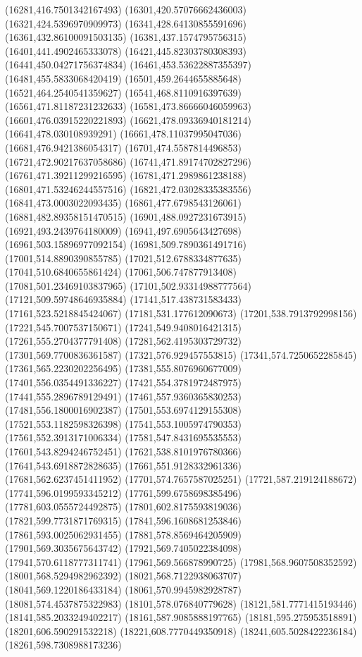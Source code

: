{(16281,416.7501342167493)
(16301,420.57076662436003)
(16321,424.5396970909973)
(16341,428.64130855591696)
(16361,432.86100091503135)
(16381,437.1574795756315)
(16401,441.4902465333078)
(16421,445.82303780308393)
(16441,450.04271756374834)
(16461,453.53622887355397)
(16481,455.5833068420419)
(16501,459.2644655885648)
(16521,464.2540541359627)
(16541,468.8110916397639)
(16561,471.81187231232633)
(16581,473.86666046059963)
(16601,476.03915220221893)
(16621,478.09336940181214)
(16641,478.030108939291)
(16661,478.11037995047036)
(16681,476.9421386054317)
(16701,474.5587814496853)
(16721,472.90217637058686)
(16741,471.89174702827296)
(16761,471.39211299216595)
(16781,471.2989861238188)
(16801,471.53246244557516)
(16821,472.03028335383556)
(16841,473.0003022093435)
(16861,477.6798543126061)
(16881,482.89358151470515)
(16901,488.0927231673915)
(16921,493.2439764180009)
(16941,497.6905643427698)
(16961,503.15896977092154)
(16981,509.7890361491716)
(17001,514.8890390855785)
(17021,512.6788334877635)
(17041,510.6840655861424)
(17061,506.747877913408)
(17081,501.23469103837965)
(17101,502.93314988777564)
(17121,509.59748646935884)
(17141,517.438731583433)
(17161,523.5218845424067)
(17181,531.177612090673)
(17201,538.7913792998156)
(17221,545.7007537150671)
(17241,549.9408016421315)
(17261,555.2704377791408)
(17281,562.4195303729732)
(17301,569.7700836361587)
(17321,576.929457553815)
(17341,574.7250652285845)
(17361,565.2230202256495)
(17381,555.8076960677009)
(17401,556.0354491336227)
(17421,554.3781972487975)
(17441,555.2896789129491)
(17461,557.9360365830253)
(17481,556.1800016902387)
(17501,553.6974129155308)
(17521,553.1182598326398)
(17541,553.1005974790353)
(17561,552.3913171006334)
(17581,547.8431695535553)
(17601,543.8294246752451)
(17621,538.8101976780366)
(17641,543.6918872828635)
(17661,551.9128332961336)
(17681,562.6237451411952)
(17701,574.7657587025251)
(17721,587.219124188672)
(17741,596.0199593345212)
(17761,599.6758698385496)
(17781,603.0555724492875)
(17801,602.8175593819036)
(17821,599.7731871769315)
(17841,596.1608681253846)
(17861,593.0025062931455)
(17881,578.8569464205909)
(17901,569.3035675643742)
(17921,569.7405022384098)
(17941,570.6118777311741)
(17961,569.566878990725)
(17981,568.9607508352592)
(18001,568.5294982962392)
(18021,568.7122938063707)
(18041,569.1220186433184)
(18061,570.9945982928787)
(18081,574.4537875322983)
(18101,578.076840779628)
(18121,581.7771415193446)
(18141,585.2033249402217)
(18161,587.9085888197765)
(18181,595.275953518891)
(18201,606.590291532218)
(18221,608.7770449350918)
(18241,605.5028422236184)
(18261,598.7308988173236)
}
